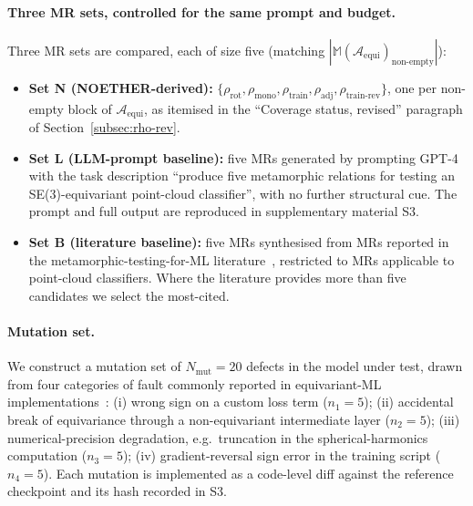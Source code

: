 \documentclass[acmsmall, screen]{acmart}
\begin{document}
\paragraph{Three MR sets, controlled for the same prompt and budget.}
Three MR sets are compared, each of size five (matching $|\mathbb{M}(\mathcal{A}_{\mathrm{equi}})_{\mathrm{non\text{-}empty}}|$):
\begin{itemize}
    \item \textbf{Set N (NOETHER-derived):} $\{\rho_{\mathrm{rot}},\rho_{\mathrm{mono}},\rho_{\mathrm{train}},\rho_{\mathrm{adj}},\rho_{\mathrm{train\text{-}rev}}\}$, one per non-empty block of $\mathcal{A}_{\mathrm{equi}}$, as itemised in the ``Coverage status, revised'' paragraph of Section~\ref{subsec:rho-rev}.
    \item \textbf{Set L (LLM-prompt baseline):} five MRs generated by prompting GPT-4 with the task description ``produce five metamorphic relations for testing an SE(3)-equivariant point-cloud classifier'', with no further structural cue. The prompt and full output are reproduced in supplementary material S3.
    \item \textbf{Set B (literature baseline):} five MRs synthesised from MRs reported in the metamorphic-testing-for-ML literature~\cite{Segura2016, Shin2024, AutoMT2025}, restricted to MRs applicable to point-cloud classifiers. Where the literature provides more than five candidates we select the most-cited.
\end{itemize}

\paragraph{Mutation set.}
We construct a mutation set of $N_{\mathrm{mut}} = 20$ defects in the model under test, drawn from four categories of fault commonly reported in equivariant-ML implementations~\cite{ThomasSmidt2018}: (i) wrong sign on a custom loss term ($n_1 = 5$); (ii) accidental break of equivariance through a non-equivariant intermediate layer ($n_2 = 5$); (iii) numerical-precision degradation, e.g.\ truncation in the spherical-harmonics computation ($n_3 = 5$); (iv) gradient-reversal sign error in the training script ($n_4 = 5$). Each mutation is implemented as a code-level diff against the reference checkpoint and its hash recorded in S3.
\end{document}
